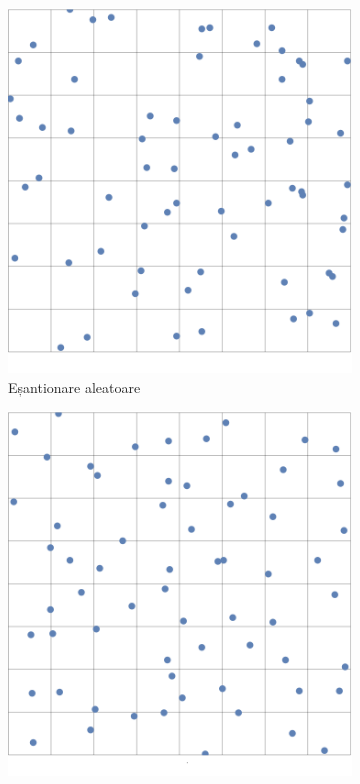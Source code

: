 \documentclass[12pt,a4paper]{report}
\numberwithin{equation}{section} %
\begin{document}
\begin{figure}[ht]
	\centering
	\begin{subfigure}[h]{0.45\linewidth}
		\centering
		\includegraphics[width=\linewidth]{pics/random-point-samples.png}
		\caption{Eșantionare aleatoare}
	\end{subfigure}
	\hfill
	\begin{subfigure}[h]{0.45\linewidth}
		\centering
		\includegraphics[width=\linewidth]{pics/jittered-point-samples.png}

\end{subfigure}
\end{figure}
\end{document}

